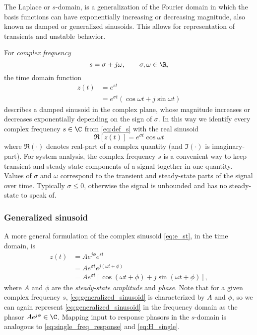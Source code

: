 The Laplace or  $s$-domain, is a generalization of the Fourier domain in which the basis functions can have exponentially increasing or decreasing magnitude, also known as damped or generalized sinusoids.  This allows for representation of transients and unstable behavior.     

For \emph{complex frequency} 
\begin{equation}
 s = \sigma + j \omega, \qquad \sigma, \omega\in \R,
\label{eq:def_s}
\end{equation}
the time domain function
\begin{align}
z(t) &= e^{st}
\label{eq:e_st}\\
&= e^{\sigma t} (\cos \omega t + j\sin\omega t)
\label{eq:gen_sinusoid}
\end{align}
describes a damped sinusoid in the complex plane, whose magnitude increases or decreases exponentially depending on the sign of $\sigma$. 
In this way we identify every complex frequency $s\in\C$ from \eqref{eq:def_s} with the real sinusoid 
\begin{equation}
\Re \left[z(t) \right] = e^{\sigma t} \cos \omega t
\label{eq:re_z}
\end{equation}
where $\Re(\cdot)$ denotes real-part of a complex quantity (and $\Im(\cdot)$ is imaginary-part).
For system analysis, the complex frequency $s$ is a convenient way to keep transient and steady-state components of a signal together in one quantity.   Values of $\sigma$ and $\omega$ correspond to the transient and steady-state parts of the signal over time.   Typically $\sigma\leq0$, otherwise the signal is unbounded and has no steady-state to speak of.

\subsubsection{Generalized sinusoid}
A more general formulation of the complex sinusoid \eqref{eq:e_st}, in the time domain, is 
\begin{align}
z(t) &= Ae^{j\phi}e^{st}\label{eq:generalized_sinusoid}\\
&= Ae^{\sigma t}e^{j(\omega t + \phi)}\nonumber\\
&= Ae^{\sigma t} \left[\cos (\omega t +\phi) + j\sin(\omega t+\phi) \right],
\end{align}
where $A$ and $\phi$ are the \emph{steady-state amplitude} and \emph{phase}.   Note that for a given complex frequency $s$, \eqref{eq:generalized_sinusoid} is characterized by $A$ and $\phi$, so  we can again represent \eqref{eq:generalized_sinusoid} in the frequency domain as the phasor  $Ae^{j\phi}\in\C$.  Mapping input to response phasors in the $s$-domain is analogous to \eqref{eq:single_freq_response} and \eqref{eq:H_single}.
\smallskip

